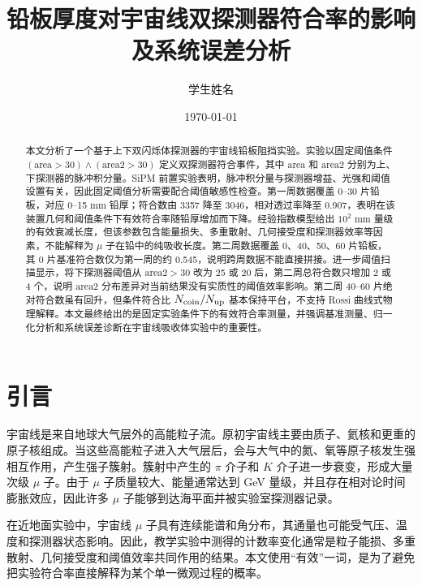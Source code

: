 \documentclass[aps,prl,twocolumn,superscriptaddress,nofootinbib]{revtex4-2}
\begin{document}
\title{铅板厚度对宇宙线双探测器符合率的影响及系统误差分析}

\author{学生姓名}

\date{\today}

\begin{abstract}
本文分析了一个基于上下双闪烁体探测器的宇宙线铅板阻挡实验。实验以固定阈值条件 $(\mathrm{area}>30)\land(\mathrm{area2}>30)$ 定义双探测器符合事件，其中 $\mathrm{area}$ 和 $\mathrm{area2}$ 分别为上、下探测器的脉冲积分量。SiPM 前置实验表明，脉冲积分量与探测器增益、光强和阈值设置有关，因此固定阈值分析需要配合阈值敏感性检查。第一周数据覆盖 0--30 片铅板，对应 0--15 mm 铅厚；符合数由 3357 降至 3046，相对透过率降至 0.907，表明在该装置几何和阈值条件下有效符合率随铅厚增加而下降。经验指数模型给出 $10^2$ mm 量级的有效衰减长度，但该参数包含能量损失、多重散射、几何接受度和探测器效率等因素，不能解释为 $\mu$ 子在铅中的纯吸收长度。第二周数据覆盖 0、40、50、60 片铅板，其 0 片基准符合数仅为第一周的约 0.545，说明跨周数据不能直接拼接。进一步阈值扫描显示，将下探测器阈值从 $\mathrm{area2}>30$ 改为 25 或 20 后，第二周总符合数只增加 2 或 4 个，说明 $\mathrm{area2}$ 分布差异对当前结果没有实质性的阈值效率影响。第二周 40--60 片绝对符合数虽有回升，但条件符合比 $N_{\rm coin}/N_{\rm up}$ 基本保持平台，不支持 Rossi 曲线式物理解释。本文最终给出的是固定实验条件下的有效符合率测量，并强调基准测量、归一化分析和系统误差诊断在宇宙线吸收体实验中的重要性。
\end{abstract}

\maketitle

\section{引言}

宇宙线是来自地球大气层外的高能粒子流。原初宇宙线主要由质子、氦核和更重的原子核组成。当这些高能粒子进入大气层后，会与大气中的氮、氧等原子核发生强相互作用，产生强子簇射。簇射中产生的 $\pi$ 介子和 $K$ 介子进一步衰变，形成大量次级 $\mu$ 子。由于 $\mu$ 子质量较大、能量通常达到 GeV 量级，并且存在相对论时间膨胀效应，因此许多 $\mu$ 子能够到达海平面并被实验室探测器记录。

在近地面实验中，宇宙线 $\mu$ 子具有连续能谱和角分布，其通量也可能受气压、温度和探测器状态影响。因此，教学实验中测得的计数率变化通常是粒子能损、多重散射、几何接受度和阈值效率共同作用的结果。本文使用“有效”一词，是为了避免把实验符合率直接解释为某个单一微观过程的概率。
\end{document}
